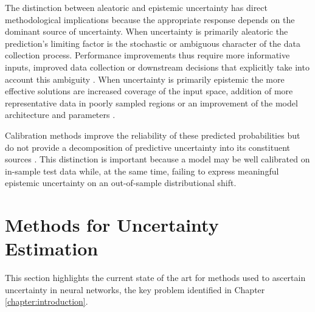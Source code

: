 The distinction between aleatoric and epistemic uncertainty has direct methodological implications because the appropriate response depends on the dominant source of uncertainty. When uncertainty is primarily aleatoric the prediction's limiting factor is the stochastic or ambiguous character of the data collection process. Performance improvements thus require more informative inputs, improved data collection or downstream decisions that explicitly take into account this ambiguity \cite{derkiureghian2009aleatory,kendall2017uncertainties}. When uncertainty is primarily epistemic the more effective solutions are increased coverage of the input space, addition of more representative data in poorly sampled regions or an improvement of the model architecture and parameters \cite{mena2021survey,jang2023survey}.

Calibration methods improve the reliability of these predicted probabilities but do not provide a decomposition of predictive uncertainty into its constituent sources \cite{mena2021survey}. This distinction is important because a model may be well calibrated on in-sample test data while, at the same time, failing to express meaningful epistemic uncertainty on an out-of-sample distributional shift. 




\section{Methods for Uncertainty Estimation} \label{chapter:Literature_Review}

This section highlights the current state of the art for methods used to ascertain uncertainty in neural networks, the key problem identified in Chapter \ref{chapter:introduction}. %
